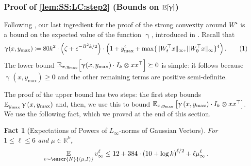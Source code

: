 \documentclass[11pt,letterpaper]{article}
\theoremstyle{plain}
\newtheorem{fact}[theorem]{Fact}
\theoremstyle{definition}
\theoremstyle{remark}
\newcommand{\yesnum}{\addtocounter{equation}{1}\tag{\theequation}}
\newcommand{\sinbrace}[1]{\ensuremath{\{#1\}}}
\newcommand{\inparen}[1]{\ensuremath{\left(#1\right)}}
\newcommand{\insquare}[1]{\ensuremath{\left[#1\right]}}
\let\norm\relax
\newcommand{\norm}[1]{\ensuremath{\left\lVert #1 \right\rVert}}
\newcommand{\R}{\mathbb{R}}
\newcommand{\E}{\operatornamewithlimits{\mathbb{E}}}
\newcommand{\Ex}{\E}
\newcommand{\customcal}[1]{\euscr{#1}}
\newcommand{\cN}{\customcal{N}}
\renewcommand{\gamma}{\upgamma}
\newcommand{\normal}[2]{\cN{\inparen{#1,#2}}}
\newcommand{\ymax}{y_{\max}}
\begin{document}
{{        
        





    \subsubsection{Proof of \cref{lem:SS:LC:step2} (Bounds on $\Ex[\gamma]$)}\label{sec:proofof:lem:SS:LC:step2}

        Following , our last ingredient for the proof of the strong convexity around $W^\star$ is a bound on the expected value of the function $\gamma$, introduced in .
        Recall that 
        \[
            \gamma(x,\ymax) \coloneqq 
                80 k^2\cdot
                \Bigl(\zeta + e^{-B^2 k/2}\Bigr)\cdot
                \Bigl(1 + \ymax^4 + \max\sinbrace{\|W_t^\top x\|_\infty, \|W_0^\top x\|_\infty}^4\Bigr)\,.
            \yesnum\label{eq:SS:LC:defGamma2}
        \]
        The lower bound $\Ex_{x,\ymax}\Bigl[\gamma(x,\ymax) \cdot I_{k}\otimes xx^\top \Bigr]\succeq 0$ is simple: it follows because $\gamma(x,\ymax)\geq 0$ and the other remaining terms are positive semi-definite.
        
        The proof of the upper bound has two steps: 
            the first step bounds $\Ex_{\ymax}{
            \gamma\inparen{x,\ymax}
            }$ and, then, we use this to bound $\Ex_{x,\ymax}\insquare{
            \gamma\inparen{x,\ymax}\cdot I_{k}\otimes xx^\top
            }$.
        We use the following fact, which we proved at the end of this section.
        \begin{fact}[Expectations of Powers of $L_\infty$-norms of Gaussian Vectors]\label{fact:GaussMaxMoments}
            For $1\leq \ell \leq 6$ and $\mu\in \R^k$,
            \[
                \Ex_{v\sim \normal{\mu}{I}}{\norm{v}_\infty^\ell} \leq 
                    12 + 384\cdot \inparen{10+\log{k}}^{\ell/2}
                    + \ell \norm{\mu}_\infty^\ell\,.
            \]
        \end{fact}
        
}}
\end{document}
